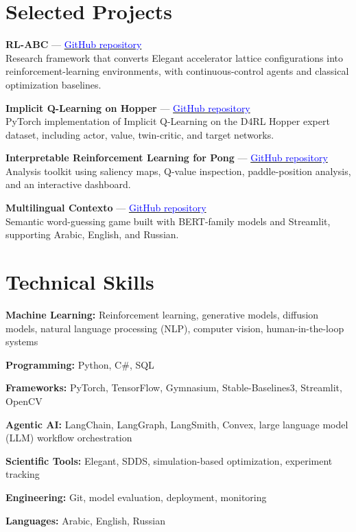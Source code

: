 \documentclass[10pt,a4paper]{article}
\newcommand{\project}[3]{%
  \textbf{#1} --- \href{#2}{\textcolor{blue}{GitHub repository}}\\[-1pt]
  {\color{muted}#3}\par
}
\newcommand{\skill}[2]{%
  \textbf{\color{navy}#1:} #2\par\vspace{2pt}
}
\begin{document}
\section{Selected Projects}
\project{RL-ABC}{https://github.com/hse-cs/RL-ABC}{Research framework that converts Elegant accelerator lattice configurations into reinforcement-learning environments, with continuous-control agents and classical optimization baselines.}
\vspace{4pt}
\project{Implicit Q-Learning on Hopper}{https://github.com/Anwar9Ibrahim/offlineRL_hopper}{PyTorch implementation of Implicit Q-Learning on the D4RL Hopper expert dataset, including actor, value, twin-critic, and target networks.}
\vspace{4pt}
\project{Interpretable Reinforcement Learning for Pong}{https://github.com/Anwar9Ibrahim/Interpretable-RL}{Analysis toolkit using saliency maps, Q-value inspection, paddle-position analysis, and an interactive dashboard.}
\vspace{4pt}
\project{Multilingual Contexto}{https://github.com/Anwar9Ibrahim/Contexto-game}{Semantic word-guessing game built with BERT-family models and Streamlit, supporting Arabic, English, and Russian.}

\section{Technical Skills}
\skill{Machine Learning}{Reinforcement learning, generative models, diffusion models, natural language processing (NLP), computer vision, human-in-the-loop systems}
\skill{Programming}{Python, C\#, SQL}
\skill{Frameworks}{PyTorch, TensorFlow, Gymnasium, Stable-Baselines3, Streamlit, OpenCV}
\skill{Agentic AI}{LangChain, LangGraph, LangSmith, Convex, large language model (LLM) workflow orchestration}
\skill{Scientific Tools}{Elegant, SDDS, simulation-based optimization, experiment tracking}
\skill{Engineering}{Git, model evaluation, deployment, monitoring}
\skill{Languages}{Arabic, English, Russian}
\end{document}
